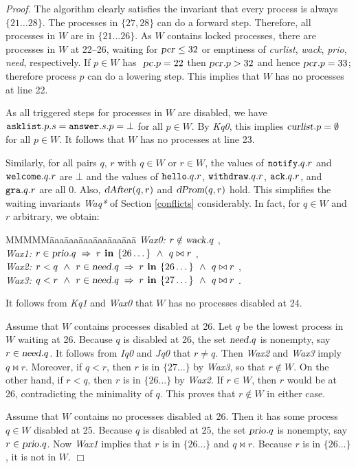 \documentclass[10pt]{article} \usepackage[english]{babel}
\newenvironment{tab}{\begin{tabbing}
MMMMM\=aaa\=aaa\=aaa\=aaa\=aaa\=aaa\= \kill}{\end{tabbing}}
\newenvironment{proof}{\noindent\emph{Proof.}}{\boks}
\def\boks  {\mbox{$\Box$}}
\def\S #1/{\mbox {\textsl{#1}}}
\def\B #1/{\mbox {\textbf{#1}}}
\def\T #1/{\mbox {\texttt{#1}}}
\def\Implies{\;\Rightarrow\;}
\def\Land   {\mbox{ $\;\land\;$ }}
\begin{document}
\begin{proof}
  The algorithm clearly satisfies the invariant that every process is
  always $\{21\dots 28\}$. The processes in $\{27, 28\}$ can do a
  forward step. Therefore, all processes in $W$ are in $\{21\dots
  26\}$. As $W$ contains locked processes, there are processes in $W$
  at 22--26, waiting for $\S pcr/\leq 32$ or emptiness of \S curlist/,
  \S wack/, \S prio/, \S need/, respectively.  If $p\in W$ has $\S
  pc/.p =22$ then $\S pcr/.p > 32$ and hence $\S pcr/.p = 33$;
  therefore process $p$ can do a lowering step.  This implies that $W$
  has no processes at line 22.

  As all triggered steps for processes in $W$ are disabled, we have
  $\T asklist/.p.s = \T answer/.s.p = \bot $ for all $p\in
  W$. By \S Kq0/, this implies $\S curlist/.p=\emptyset$ for all $p\in
  W$.  It follows that $W$ has no processes at line 23. 

  Similarly, for all pairs $q$, $r$ with $q\in W$ or $r\in W$, the
  values of $\T notify/.q.r$ and $\T welcome/.q.r$ are $\bot$ and the
  values of $\T hello/.q.r $, $ \T withdraw/.q.r$, $\T ack/.q.r$, and
  $\T gra/.q.r$ are all 0.  Also, $\S dAfter/(q,r)$ and $\S dProm/(q,
  r)$ hold.  This simplifies the waiting invariants \S Waq*/ of
  Section \ref{conflicts} considerably. In fact, for $q\in W$ and $r$
  arbitrary, we obtain:
\begin{tab}
\S Wax0:/ \> $ r\notin\S wack/.q $ ,\\
\S Wax1:/ \> $ r\in\S prio/.q\Implies r\B\ in /\{26\dots\}
\Land q\bowtie r $ ,\\
\S Wax2:/ \> $ r < q \Land r\in\S need/.q\Implies r\B\ in /\{26\dots\}
\Land q\bowtie r $ ,\\
\S Wax3:/ \> $ q < r \Land r\in\S need/.q\Implies r\B\ in /\{27\dots\}
\Land q\bowtie r $ .
\end{tab}
It follows from \S Kq1/ and \S Wax0/ that $W$ has no processes
disabled at 24.

Assume that $W$ contains processes disabled at 26. Let $q$ be the
lowest process in $W$ waiting at 26.  Because $q$ is disabled at 26,
the set $\S need/.q$ is nonempty, say $r\in\S need/.q$. It follows
from \S Iq0/ and \S Jq0/ that $r\ne q$. Then \S Wax2/ and \S Wax3/
imply $q\bowtie r$.  Moreover, if $q < r$, then $r$ is in $\{27\dots\}$
by \S Wax3/, so that $r\notin W$. On the other hand, if $r < q$, then
$r$ is in $\{26\dots\}$ by \S Wax2/. If $r\in W$, then $r$ would be at
26, contradicting the minimality of $q$. This proves that $r\notin W$
in either case.

Assume that $W$ contains no processes disabled at 26. Then it has some
process $q\in W$ disabled at 25. Because $q$ is disabled at 25, the
set $\S prio/.q$ is nonempty, say $r\in\S prio/.q$. Now \S Wax1/
implies that $r$ is in $\{26\dots\}$ and $q\bowtie r$. Because $r$ is
in $\{26\dots\}$, it is not in $W$. 
\end{proof}
\end{document}

